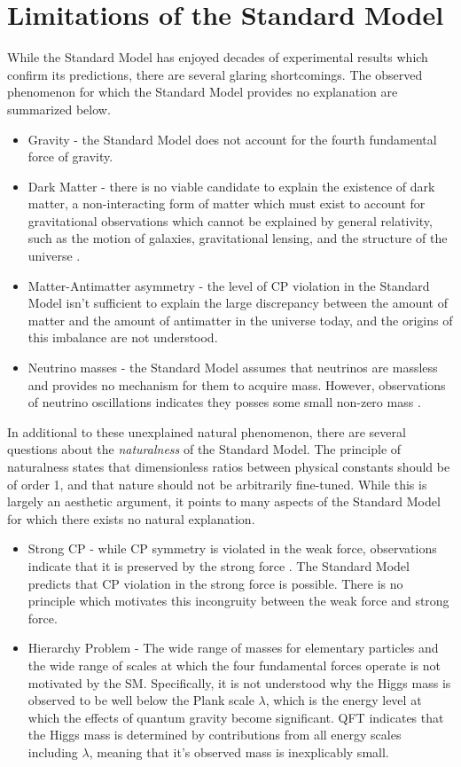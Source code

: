 \section{Limitations of the Standard Model}
\label{sec:lim_sm}

While the Standard Model has enjoyed decades of experimental results which confirm its predictions, there are several glaring shortcomings. The observed phenomenon for which the Standard Model provides no explanation are summarized below.

\begin{itemize}
  \item Gravity - the Standard Model does not account for the fourth fundamental force of gravity.
  \item Dark Matter - there is no viable candidate to explain the existence of dark matter, a non-interacting form of matter which must exist to account for gravitational observations which cannot be explained by general relativity, such as the motion of galaxies, gravitational lensing, and the structure of the universe \cite{dm}.
  \item Matter-Antimatter asymmetry - the level of CP violation in the Standard Model isn't sufficient to explain the large discrepancy between the amount of matter and the amount of antimatter in the universe today, and the origins of this imbalance are not understood.
  \item Neutrino masses - the Standard Model assumes that neutrinos are massless and provides no mechanism for them to acquire mass. However, observations of neutrino oscillations indicates they posses some small non-zero mass \cite{neutrino_osc}.
\end{itemize}

In additional to these unexplained natural phenomenon, there are several questions about the \textit{naturalness} of the Standard Model. The principle of naturalness states that dimensionless ratios between physical constants should be of order 1, and that nature should not be arbitrarily fine-tuned. While this is largely an aesthetic argument, it points to many aspects of the Standard Model for which there exists no natural explanation.

\begin{itemize}
  \item Strong CP - while CP symmetry is violated in the weak force, observations indicate that it is preserved by the strong force \cite{strongCP}. The Standard Model predicts that CP violation in the strong force is possible. There is no principle which motivates this incongruity between the weak force and strong force.
  \item Hierarchy Problem - The wide range of masses for elementary particles and the wide range of scales at which the four fundamental forces operate is not motivated by the SM. Specifically, it is not understood why the Higgs mass is observed to be well below the Plank scale $\lambda$, which is the energy level at which the effects of quantum gravity become significant. QFT indicates that the Higgs mass is determined by contributions from all energy scales including $\lambda$, meaning that it's observed mass is inexplicably small.
\end{itemize}

